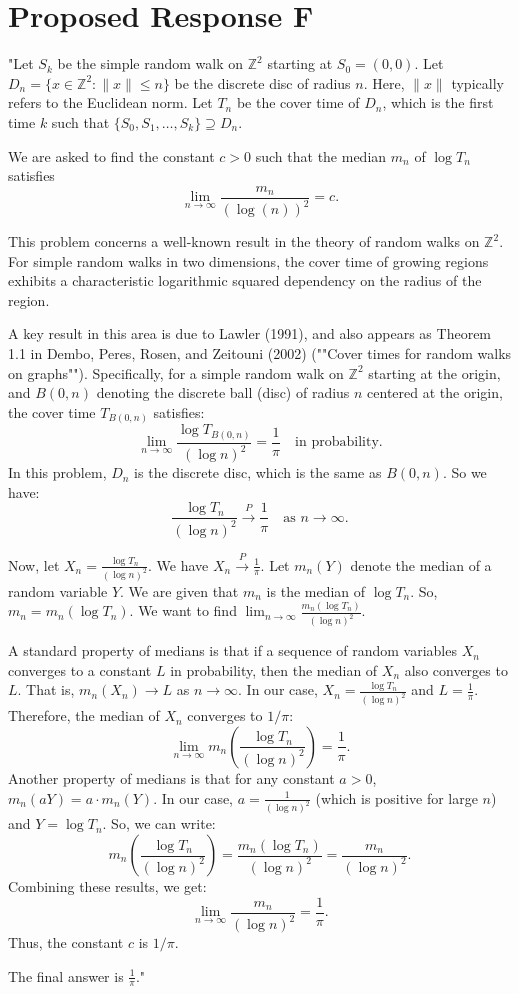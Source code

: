 \documentclass[11pt]{article}
\begin{document}
\section*{Proposed Response F}
"Let $S_k$ be the simple random walk on $\mathbb{Z}^2$ starting at $S_0 = (0,0)$.
Let $D_n = \{x \in \mathbb{Z}^2 : \|x\| \leq n\}$ be the discrete disc of radius $n$. Here, $\|x\|$ typically refers to the Euclidean norm.
Let $T_n$ be the cover time of $D_n$, which is the first time $k$ such that $\{S_0, S_1, \dots, S_k\} \supseteq D_n$.

We are asked to find the constant $c > 0$ such that the median $m_n$ of $\log T_n$ satisfies
$$
\lim _{n \rightarrow \infty} \frac{m_n}{(\log(n))^2} = c.
$$

This problem concerns a well-known result in the theory of random walks on $\mathbb{Z}^2$. For simple random walks in two dimensions, the cover time of growing regions exhibits a characteristic logarithmic squared dependency on the radius of the region.

A key result in this area is due to Lawler (1991), and also appears as Theorem 1.1 in Dembo, Peres, Rosen, and Zeitouni (2002) (""Cover times for random walks on graphs"").
Specifically, for a simple random walk on $\mathbb{Z}^2$ starting at the origin, and $B(0,n)$ denoting the discrete ball (disc) of radius $n$ centered at the origin, the cover time $T_{B(0,n)}$ satisfies:
$$
\lim_{n \rightarrow \infty} \frac{\log T_{B(0,n)}}{(\log n)^2} = \frac{1}{\pi} \quad \text{in probability.}
$$
In this problem, $D_n$ is the discrete disc, which is the same as $B(0,n)$. So we have:
$$
\frac{\log T_n}{(\log n)^2} \xrightarrow{P} \frac{1}{\pi} \quad \text{as } n \rightarrow \infty.
$$

Now, let $X_n = \frac{\log T_n}{(\log n)^2}$. We have $X_n \xrightarrow{P} \frac{1}{\pi}$.
Let $m_n(Y)$ denote the median of a random variable $Y$. We are given that $m_n$ is the median of $\log T_n$. So, $m_n = m_n(\log T_n)$.
We want to find $\lim_{n \rightarrow \infty} \frac{m_n(\log T_n)}{(\log n)^2}$.

A standard property of medians is that if a sequence of random variables $X_n$ converges to a constant $L$ in probability, then the median of $X_n$ also converges to $L$. That is, $m_n(X_n) \to L$ as $n \to \infty$.
In our case, $X_n = \frac{\log T_n}{(\log n)^2}$ and $L = \frac{1}{\pi}$.
Therefore, the median of $X_n$ converges to $1/\pi$:
$$
\lim_{n \rightarrow \infty} m_n\left(\frac{\log T_n}{(\log n)^2}\right) = \frac{1}{\pi}.
$$
Another property of medians is that for any constant $a > 0$, $m_n(aY) = a \cdot m_n(Y)$.
In our case, $a = \frac{1}{(\log n)^2}$ (which is positive for large $n$) and $Y = \log T_n$.
So, we can write:
$$
m_n\left(\frac{\log T_n}{(\log n)^2}\right) = \frac{m_n(\log T_n)}{(\log n)^2} = \frac{m_n}{(\log n)^2}.
$$
Combining these results, we get:
$$
\lim_{n \rightarrow \infty} \frac{m_n}{(\log n)^2} = \frac{1}{\pi}.
$$
Thus, the constant $c$ is $1/\pi$.

The final answer is $\boxed{\frac{1}{\pi}}$."
\end{document}
